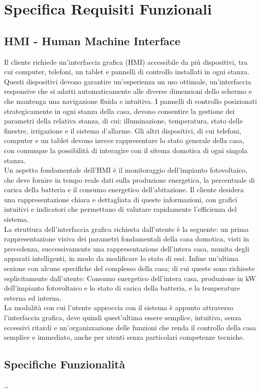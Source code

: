 \documentclass[italian, 12pt, a4paper]{article}
\begin{document}
\section{Specifica Requisiti Funzionali}\label{sec:requisiti2}
\subsection{HMI - Human Machine Interface}
Il cliente richiede un’interfaccia grafica (HMI) accessibile da più dispositivi, tra cui computer, telefoni, un tablet e pannelli di controllo installati in ogni stanza. Questi dispositivi devono garantire un'esperienza un uso ottimale, un'interfaccia responsive che si adatti automaticamente alle diverse dimensioni dello schermo e che mantenga una navigazione fluida e intuitiva.  I pannelli di controllo posizionati strategicamente in ogni stanza della casa, devono consentire la gestione dei parametri della relativa stanza, di cui: illuminazione, temperatura, stato delle finestre, irrigazione e il sistema d’allarme. Gli altri dispositivi, di cui telefoni, computer e un tablet devono invece rappresentare lo stato generale della casa, con comunque la possibilità di interagire con il sitema domotica di ogni singola stanza.\\[1.5mm]
Un aspetto fondamentale dell’HMI è il monitoraggio dell’impianto fotovoltaico, che deve fornire in tempo reale dati sulla produzione energetica, la percentuale di carica della batteria e il consumo energetico dell’abitazione. Il cliente desidera una rappresentazione chiara e dettagliata di queste informazioni, con grafici intuitivi e indicatori che permettano di valutare rapidamente l’efficienza del sistema.\\[1.5mm]
La struttura dell’interfaccia grafica richiesta dall’utente è la seguente: un prima rappresentazione visiva dei parametri fondamentali della casa domotica, visti in precedenza, successivamente una rappresentazione dell’intera casa, munita degli apparati intelligenti, in modo da modificare lo stato di essi. Infine un’ultima sezione con alcune specifiche del complesso della casa; di cui queste sono richieste esplicitamente dall’utente: Consumo energetico dell’intera casa, produzione in kW dell’impianto fotovoltaico e lo stato di carica della batteria, e la temperature esterna ed interna.\\[1.5mm]
La modalità con cui l’utente approccia con il sistema è appunto attraverso l’interfaccia grafica, deve quindi quest’ultima essere semplice, intuitiva, senza eccessivi ritardi e un’organizzazione delle funzioni che renda il controllo della casa semplice e immediato, anche per utenti senza particolari competenze tecniche.
\subsection{Specifiche Funzionalità}
\ldots
\clearpage
\end{document}

